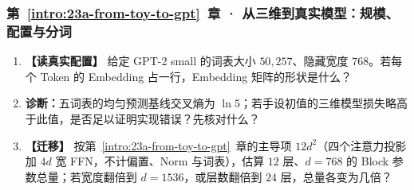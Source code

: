 \subsubsection*{第~\ref*{intro:23a-from-toy-to-gpt}~章 · 从三维到真实模型：规模、配置与分词}
\begin{enumerate}[label={},leftmargin=4.8em,itemsep=4pt]
\item[\textbf{C-089.}] \leavevmode{}\label{exercise:C-089}\label{exercise:real-embedding-shape}\textbf{【读真实配置】} 给定 GPT-2 small 的词表大小 $50{,}257$、隐藏宽度 $768$。若每个 Token 的 Embedding 占一行，Embedding 矩阵的形状是什么？
\item[\textbf{C-090.}] \leavevmode{}\label{exercise:C-090}\label{exercise:uniform-baseline-interpretation}\textbf{诊断：}五词表的均匀预测基线交叉熵为 $\ln5$；若手设初值的三维模型损失略高于此值，是否足以证明实现错误？先核对什么？
\item[\textbf{C-091.}] \leavevmode{}\label{exercise:C-091}\label{exercise:compute-token-budget}\textbf{【迁移】} 按第~\ref*{intro:23a-from-toy-to-gpt}~章的主导项 $12d^2$（四个注意力投影加 $4d$ 宽 FFN，不计偏置、Norm 与词表），估算 $12$ 层、$d=768$ 的 Block 参数总量；若宽度翻倍到 $d=1536$，或层数翻倍到 $24$ 层，总量各变为几倍？
\end{enumerate}
